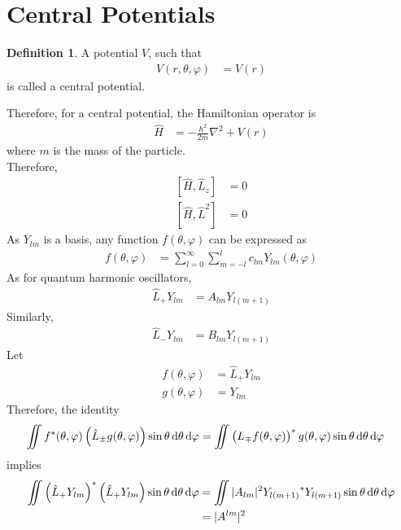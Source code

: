 \documentclass[titlepage, fleqn, a4paper, 12pt, twoside]{article}
\theoremstyle{definition}
\newtheorem{definition}{Definition}
\theoremstyle{theorem}
\let\Oldsection\section
\renewcommand{\section}{\FloatBarrier\Oldsection}
\begin{document}
\section{Central Potentials}

\begin{definition}
	A potential $V$, such that
	\begin{align*}
		V(r,\theta,\varphi) &= V(r)
	\end{align*}
	is called a central potential.
\end{definition}

Therefore, for a central potential, the Hamiltonian operator is
\begin{align*}
	\hat{H} &= -\frac{\hbar^2}{2 m} \nabla^2 + V(r)
\end{align*}
where $m$ is the mass of the particle.\\
Therefore,
\begin{align*}
	\left[ \hat{H},\hat{L}_z \right] &= 0\\
	\left[ \hat{H},\hat{L}^2 \right] &= 0
\end{align*}
As $Y_{l m}$ is a basis, any function $f(\theta,\varphi)$ can be expressed as
\begin{align*}
	f(\theta,\varphi) &= \sum\limits_{l = 0}^{\infty} \sum\limits_{m = -l}^{l} c_{l m} Y_{l m}(\theta,\varphi)
\end{align*}
As for quantum harmonic oscillators,
\begin{align*}
	\hat{L}_+ Y_{l m} &= A_{l m} Y_{l (m + 1)}
\end{align*}
Similarly,
\begin{align*}
	\hat{L}_- Y_{l m} &= B_{l m} Y_{l (m + 1)}
\end{align*}
Let
\begin{align*}
	f(\theta,\varphi) &= \hat{L}_+ Y_{l m}\\
	g(\theta,\varphi) &= Y_{l m}
\end{align*}
Therefore, the identity
\begin{align*}
	\iint f^*(\theta,\varphi) \left( \hat{L}_{\pm} g(\theta,\varphi) \right) \sin \theta \dif \theta \dif \varphi &= \iint \left( L_{\mp} f(\theta,\varphi) \right)^* g(\theta,\varphi) \sin \theta \dif \theta \dif \varphi
\end{align*}
implies
\begin{align*}
	\iint \left( \hat{L}_+ Y_{l m} \right)^* \left( \hat{L}_+ Y_{l m} \right) \sin \theta \dif \theta \dif \varphi &= \iint |A_{l m}|^2 {Y_{l (m + 1)}}^* Y_{l (m + 1)} \sin \theta \dif \theta \dif \varphi\\
	&= |A^{l m}|^2
\end{align*}
\end{document}

